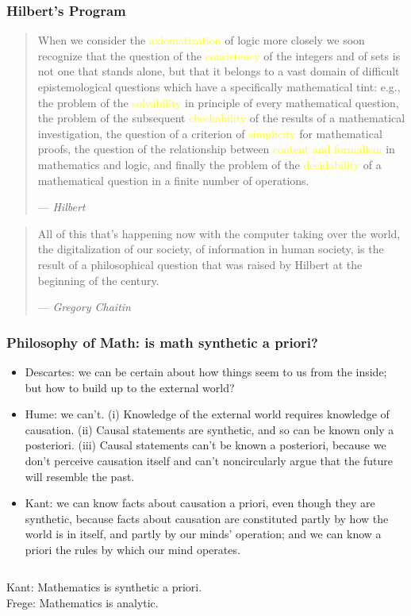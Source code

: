 \documentclass[UTF8,aspectratio=43,11pt,colorlinks,compress,openany]{beamer}%
\begin{document}
\begin{frame}\frametitle{Hilbert's Program}
	\begin{quote}
		{\small When we consider the \textcolor{yellow}{axiomatization} of logic more closely we soon recognize that the question of the \textcolor{yellow}{consistency} of the integers and of sets is not one that stands alone, but that it belongs to a vast domain of difficult epistemological questions which have a specifically mathematical tint: e.g., the problem of the \textcolor{yellow}{solvability} in principle of every mathematical question, the problem of the subsequent \textcolor{yellow}{checkability} of the results of a mathematical investigation, the question of a criterion of \textcolor{yellow}{simplicity} for mathematical proofs, the question of the relationship between \textcolor{yellow}{content and formalism} in mathematics and logic, and finally the problem of the \textcolor{yellow}{decidability} of a mathematical question in a finite number of operations.\par
			\hfill --- \textsl{Hilbert}}
	\end{quote}
	\begin{quote}
		{\small All of this that's happening now with the computer taking over the world, the digitalization of our society, of information in human society, is the result of a philosophical question that was raised by Hilbert at the beginning of the century.\par\hfill --- \textsl{Gregory Chaitin}}
	\end{quote}
\end{frame}

\begin{frame}\frametitle{Philosophy of Math: is math synthetic a priori?}
\begin{itemize}
	\item Descartes: we can be certain about how things seem to us from the inside; but how to build up to the external world?
	\item Hume: we can't. (i) Knowledge of the external world requires knowledge of causation. (ii) Causal statements are synthetic, and so can be known only a posteriori. (iii) Causal statements can't be known a posteriori, because we don't perceive causation itself and can't noncircularly argue that the future will resemble the past.
	\item Kant: we can know facts about causation a priori, even though they are synthetic, because facts about causation are constituted partly by how the world is in itself, and partly by our minds' operation; and we can know a priori the rules by which our mind operates.
\end{itemize}
\begin{columns}
Kant: Mathematics is synthetic a priori.\\
Frege: Mathematics is analytic.
\end{columns}
\end{frame}
\end{document}
